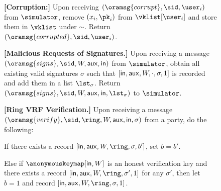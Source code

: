\begin{figure}
\begin{tcolorbox}[left=2pt,right=2pt]
{			\textbf{[Corruption:] } 
			Upon receiving $ (\oramsg{corrupt}, \sid, \user_i) $ from $ \simulator $, remove $ (x_i,\pk_i) $ from $ \vklist[\user_i] $ and store them in $ \vklist $ under $ \sim $. Return $ (\oramsg{corrupted}, \sid,\user_i) $.
			
			\textbf{[Malicious Requests of  Signatures.]} Upon receiving a message $ (\oramsg{signs}, \sid, \allowbreak W, \aux,\msg) $ from $ \simulator $, obtain all existing valid signatures $ \sigma $ such that $ [\mathsf{in}, \mathsf{aux},W, \cdot ,\sigma, 1] $ is recorded and add them in a list $ \lst_{\sigma} $. 	Return $ (\oramsg{signs}, \sid, W,\aux,\msg, \lst_{\sigma})  $ to $ \simulator $.
			
			\textbf{[Ring VRF Verification.]} Upon receiving a message $(\oramsg{verify}, \sid, \ring,W, \aux, \msg, \sigma)$ from a party, do the following: 
				\vspace{-.7mm}
				\begin{list}{\hspace*{1pt} C}{\setlength\leftmargin{0.15in}}
					\item If there exists a record $ [\msg,\aux,W,\ring,\sigma, b'] $, set $ b = b' $. 
					
					\label{cond:consistency}
					\item Else if $ \anonymouskeymap[\msg,W]  $ is an honest verification key and  there exists a record $ [\msg,\aux, W, \ring, \sigma', 1] $ for any $ \sigma' $, then let $ b=1 $ and record $ [\msg, \allowbreak \aux, \allowbreak W,\ring,\sigma, 1] $. 
					\label{cond:differentsignature}
					

\end{list}}
\end{tcolorbox}
\end{figure}
